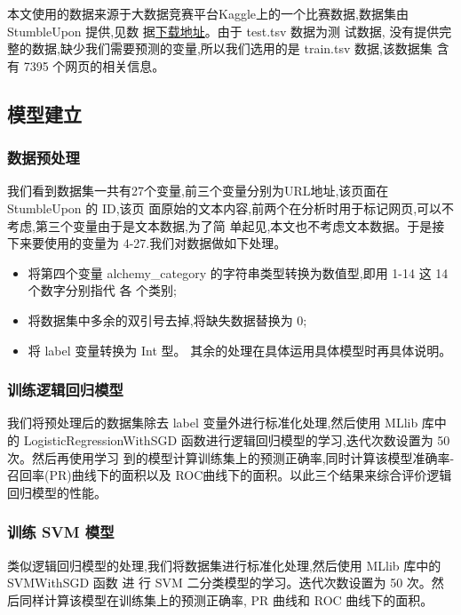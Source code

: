 本文使用的数据来源于大数据竞赛平台Kaggle上的一个比赛数据,数据集由
StumbleUpon 提供,见数
据\href{https://www.kaggle.com/c/stumbleupon/data?train.tsv}{下载地址}。由于
test.tsv 数据为测 试数据,
没有提供完整的数据,缺少我们需要预测的变量,所以我们选用的是 train.tsv
数据,该数据集 含有 7395 个网页的相关信息。

\subsection{模型建立}\label{ux6a21ux578bux5efaux7acb}

\subsubsection{数据预处理}\label{ux6570ux636eux9884ux5904ux7406}

我们看到数据集一共有27个变量,前三个变量分别为URL地址,该页面在
StumbleUpon 的 ID,该页
面原始的文本内容,前两个在分析时用于标记网页,可以不考虑,第三个变量由于是文本数据,为了简
单起见,本文也不考虑文本数据。于是接下来要使用的变量为
4-27.我们对数据做如下处理。

\begin{itemize}
\item
  将第四个变量 alchemy\_category 的字符串类型转换为数值型,即用 1-14 这
  14 个数字分别指代 各 个类别;
\item
  将数据集中多余的双引号去掉,将缺失数据替换为 0;
\item
  将 label 变量转换为 Int 型。
  其余的处理在具体运用具体模型时再具体说明。
\end{itemize}

\subsubsection{训练逻辑回归模型}\label{ux8badux7ec3ux903bux8f91ux56deux5f52ux6a21ux578b}

我们将预处理后的数据集除去 label 变量外进行标准化处理,然后使用 MLlib
库中的 LogisticRegressionWithSGD
函数进行逻辑回归模型的学习,迭代次数设置为 50 次。然后再使用学习
到的模型计算训练集上的预测正确率,同时计算该模型准确率-召回率(PR)曲线下的面积以及
ROC曲线下的面积。以此三个结果来综合评价逻辑回归模型的性能。

\subsubsection{训练 SVM 模型}\label{ux8badux7ec3-svm-ux6a21ux578b}

类似逻辑回归模型的处理,我们将数据集进行标准化处理,然后使用 MLlib 库中的
SVMWithSGD 函数 进 行 SVM 二分类模型的学习。迭代次数设置为 50
次。然后同样计算该模型在训练集上的预测正确率, PR 曲线和 ROC
曲线下的面积。

